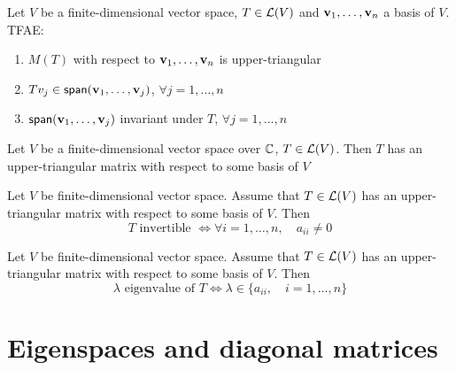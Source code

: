\documentclass[aspectratio=169]{beamer}
\begin{document}
\begin{frame}
\begin{theorem}
Let $V$ be a finite-dimensional vector space, $T\in\mathcal{L}(V)$ and $\mathbf{v}_1,\ldots,\mathbf{v}_n$ a basis of $V$. TFAE:
\begin{enumerate}
\item $M(T)$ with respect to $\mathbf{v}_1,\ldots,\mathbf{v}_n$ is upper-triangular
\item $Tv_j\in\mathsf{span}(\mathbf{v}_1,\ldots,\mathbf{v}_j)$, $\forall j=1,\ldots,n$
\item $\mathsf{span}(\mathbf{v}_1,\ldots,\mathbf{v}_j)$ invariant under $T$, $\forall j=1,\ldots,n$
\end{enumerate}
\end{theorem}
\vfill
\begin{importanttheorem}
Let $V$ be a finite-dimensional vector space over $\mathbb{C}$, $T\in\mathcal{L}(V)$. Then $T$ has an upper-triangular matrix with respect to some basis of $V$
\end{importanttheorem}
\end{frame}


\begin{frame}
\begin{importanttheorem}
Let $V$ be finite-dimensional vector space. Assume that $T\in\mathcal{L}(V)$ has an upper-triangular matrix with respect to some basis of $V$. Then
\[
T\textrm{ invertible }\Leftrightarrow\forall i=1,\ldots,n,\quad a_{ii}\neq 0
\]
\end{importanttheorem}
\vfill
\begin{importanttheorem}
Let $V$ be finite-dimensional vector space. Assume that $T\in\mathcal{L}(V)$ has an upper-triangular matrix with respect to some basis of $V$. Then
\[
\lambda\textrm{ eigenvalue of }T\Leftrightarrow\lambda\in\{a_{ii},\quad i=1,\ldots,n\}
\]
\end{importanttheorem}
\end{frame}



\section{Eigenspaces and diagonal matrices}
\end{document}
